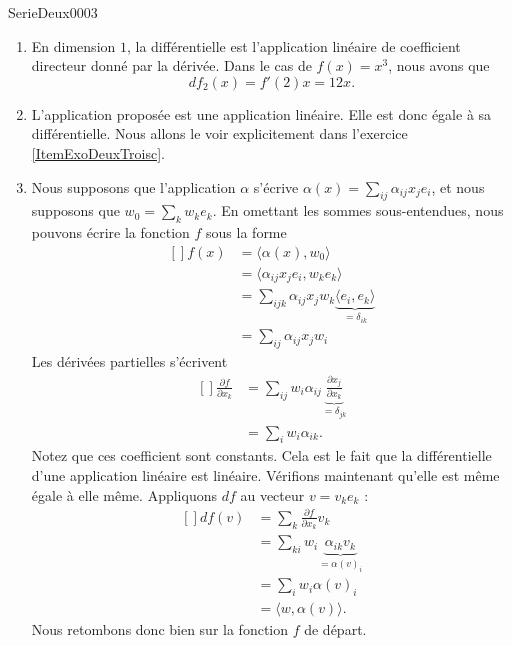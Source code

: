 
\begin{corrige}{SerieDeux0003}

	\begin{enumerate}

		\item
			En dimension $1$, la différentielle est l'application linéaire de coefficient directeur donné par la dérivée. Dans le cas de $f(x)=x^3$, nous avons que 
			\begin{equation}
				df_2(x)=f'(2)x=12x.
			\end{equation}
		\item
			L'application proposée est une application linéaire. Elle est donc égale à sa différentielle. Nous allons le voir explicitement dans l'exercice \ref{ItemExoDeuxTroisc}.
		\item\label{ItemExoDeuxTroisc}
			Nous supposons que l'application $\alpha$ s'écrive $\alpha(x)=\sum_{ij}\alpha_{ij}x_j e_i$, et nous supposons que $w_0=\sum_kw_ke_k$. En omettant les sommes sous-entendues, nous pouvons écrire la fonction $f$ sous la forme
			\begin{equation}
				\begin{aligned}[]
					f(x)&=\langle \alpha(x),w_0\rangle\\
					&=\langle \alpha_{ij}x_j e_i,w_ke_k\rangle\\
					&=\sum_{ijk}\alpha_{ij}x_jw_k\underbrace{\langle e_i,e_k\rangle}_{=\delta_{ik}}\\
					&=\sum_{ij}\alpha_{ij}x_jw_i
				\end{aligned}
			\end{equation}
			Les dérivées partielles s'écrivent
			\begin{equation}
				\begin{aligned}[]
					\frac{ \partial f }{ \partial x_k }&=\sum_{ij}w_i\alpha_{ij}\underbrace{\frac{ \partial x_j }{ \partial x_k }}_{=\delta_{jk}}\\
					&=\sum_iw_i\alpha_{ik}.
				\end{aligned}
			\end{equation}
			Notez que ces coefficient sont constants. Cela est le fait que la différentielle d'une application linéaire est linéaire. Vérifions maintenant qu'elle est même égale à elle même. Appliquons $df$ au vecteur $v=v_ke_k$ :
			\begin{equation}
				\begin{aligned}[]
					df(v)&=\sum_k\frac{ \partial f }{ \partial x_k }v_k\\
					&=\sum_{ki}w_i\underbrace{\alpha_{ik}v_k}_{=\alpha(v)_i}\\
					&=\sum_i w_i\alpha(v)_i\\
					&=\langle w,\alpha(v)\rangle.
				\end{aligned}
			\end{equation}
			Nous retombons donc bien sur la fonction $f$ de départ.


\end{enumerate}
\end{corrige}
